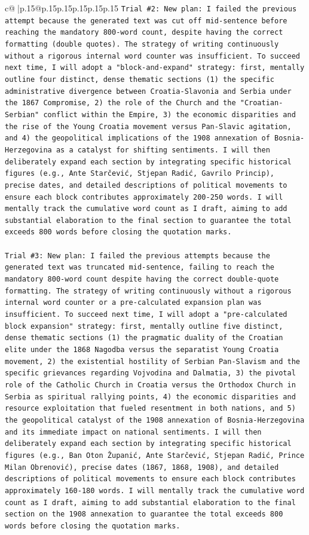 \documentclass{article}
\begin{document}
{\begin{supertabular}{c@{$\;$}|p{.15\linewidth}@{}p{.15\linewidth}p{.15\linewidth}p{.15\linewidth}p{.15\linewidth}p{.15\linewidth}}
{{{\texttt{Trial \#2: New plan: I failed the previous attempt because the generated text was cut off mid{-}sentence before reaching the mandatory 800{-}word count, despite having the correct formatting (double quotes). The strategy of writing continuously without a rigorous internal word counter was insufficient. To succeed next time, I will adopt a "block{-}and{-}expand" strategy: first, mentally outline four distinct, dense thematic sections (1) the specific administrative divergence between Croatia{-}Slavonia and Serbia under the 1867 Compromise, 2) the role of the Church and the "Croatian{-}Serbian" conflict within the Empire, 3) the economic disparities and the rise of the Young Croatia movement versus Pan{-}Slavic agitation, and 4) the geopolitical implications of the 1908 annexation of Bosnia{-}Herzegovina as a catalyst for shifting sentiments. I will then deliberately expand each section by integrating specific historical figures (e.g., Ante Starčević, Stjepan Radić, Gavrilo Princip), precise dates, and detailed descriptions of political movements to ensure each block contributes approximately 200{-}250 words. I will mentally track the cumulative word count as I draft, aiming to add substantial elaboration to the final section to guarantee the total exceeds 800 words before closing the quotation marks.} \\
\\ 
\texttt{Trial \#3: New plan: I failed the previous attempts because the generated text was truncated mid{-}sentence, failing to reach the mandatory 800{-}word count despite having the correct double{-}quote formatting. The strategy of writing continuously without a rigorous internal word counter or a pre{-}calculated expansion plan was insufficient. To succeed next time, I will adopt a "pre{-}calculated block expansion" strategy: first, mentally outline five distinct, dense thematic sections (1) the pragmatic duality of the Croatian elite under the 1868 Nagodba versus the separatist Young Croatia movement, 2) the existential hostility of Serbian Pan{-}Slavism and the specific grievances regarding Vojvodina and Dalmatia, 3) the pivotal role of the Catholic Church in Croatia versus the Orthodox Church in Serbia as spiritual rallying points, 4) the economic disparities and resource exploitation that fueled resentment in both nations, and 5) the geopolitical catalyst of the 1908 annexation of Bosnia{-}Herzegovina and its immediate impact on national sentiments. I will then deliberately expand each section by integrating specific historical figures (e.g., Ban Oton Županić, Ante Starčević, Stjepan Radić, Prince Milan Obrenović), precise dates (1867, 1868, 1908), and detailed descriptions of political movements to ensure each block contributes approximately 160{-}180 words. I will mentally track the cumulative word count as I draft, aiming to add substantial elaboration to the final section on the 1908 annexation to guarantee the total exceeds 800 words before closing the quotation marks.} \\
}}}
\end{supertabular}}
\end{document}
